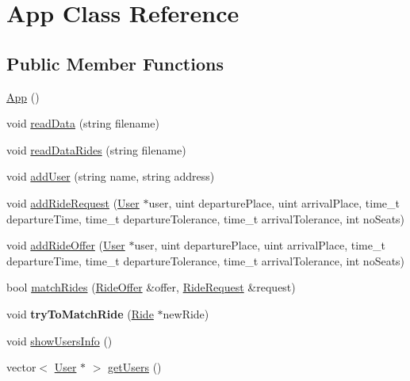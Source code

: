 \hypertarget{class_app}{}\section{App Class Reference}
\label{class_app}
\subsection*{Public Member Functions}
\begin{DoxyCompactItemize}
\item 
\hyperlink{class_app_acb8cbf3e285b91d0170ffe87df5989c5}{App} ()
\item 
void \hyperlink{class_app_ab996c03e3b8455a98c3ee32684353bf4}{read\+Data} (string filename)
\item 
void \hyperlink{class_app_a22ee53e2dc589184357e31a61bbb1bbc}{read\+Data\+Rides} (string filename)
\item 
void \hyperlink{class_app_a726ada082015afbaf04b4f2bcc4dbd6d}{add\+User} (string name, string address)
\item 
void \hyperlink{class_app_ac03ffaeef9892bec7f6b304c647073c9}{add\+Ride\+Request} (\hyperlink{class_user}{User} $\ast$user, uint departure\+Place, uint arrival\+Place, time\+\_\+t departure\+Time, time\+\_\+t departure\+Tolerance, time\+\_\+t arrival\+Tolerance, int no\+Seats)
\item 
void \hyperlink{class_app_a5510b9f90f870dbf3b6c2ab678e63f27}{add\+Ride\+Offer} (\hyperlink{class_user}{User} $\ast$user, uint departure\+Place, uint arrival\+Place, time\+\_\+t departure\+Time, time\+\_\+t departure\+Tolerance, time\+\_\+t arrival\+Tolerance, int no\+Seats)
\item 
bool \hyperlink{class_app_ab93229e931835d421b5bb9e2fa241f44}{match\+Rides} (\hyperlink{class_ride_offer}{Ride\+Offer} \&offer, \hyperlink{class_ride_request}{Ride\+Request} \&request)
\item 
\hypertarget{class_app_a15ead9be0555e2e208818eb8f4020bfc}{}void {\bfseries try\+To\+Match\+Ride} (\hyperlink{class_ride}{Ride} $\ast$new\+Ride)\label{class_app_a15ead9be0555e2e208818eb8f4020bfc}

\item 
void \hyperlink{class_app_a587b90a006f1dacc52608259f729ee30}{show\+Users\+Info} ()
\item 
vector$<$ \hyperlink{class_user}{User} $\ast$ $>$ \hyperlink{class_app_a389988991bdbe0002c9df1245708c29e}{get\+Users} ()
\end{DoxyCompactItemize}


